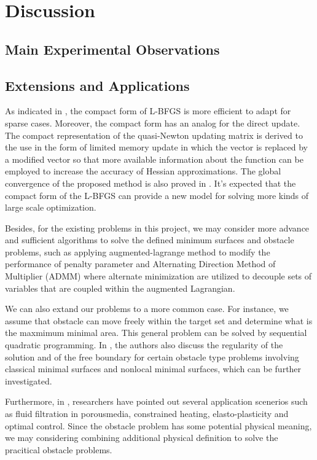 \section{Discussion}
\subsection{Main Experimental Observations}
\subsection{Extensions and Applications}
As indicated in \cite{yueting2007compact}, the compact form of L-BFGS is more efficient to adapt for sparse cases. Moreover, the compact form has an analog for the direct update. The compact representation of the quasi-Newton updating matrix is derived to the use in the form of limited memory update in which the vector is replaced by a modified vector so that more available information about the function can be employed to increase the accuracy of Hessian approximations. The global convergence of the proposed method is also proved in \cite{yueting2007compact}. It’s expected that the compact form of the L-BFGS can provide a new model for solving more kinds of large scale optimization. 

Besides, for the existing problems in this project, we may consider more advance and sufficient algorithms to solve the defined minimum surfaces and obstacle problems, such as applying augmented-lagrange method to modify the performance of penalty parameter and Alternating Direction Method of Multiplier (ADMM) where alternate minimization are utilized to decouple sets of variables that are coupled within the augmented Lagrangian.

We can also extand our problems to a more common case. For instance, we assume that obstacle can move freely within the target set and determine what is the maxmimum minimal area. This general problem can be solved by 
sequential quadratic programming. In \cite{caffarelli2016obstacle}, the authors also discuss the regularity of the solution and of the free boundary for certain obstacle type problems involving classical minimal surfaces and nonlocal minimal surfaces, which can be further investigated.

Furthermore, in \cite{attouch2014variational}, researchers have pointed out several application scenerios such as fluid filtration in porousmedia, constrained heating, elasto-plasticity and optimal control. Since the obstacle problem has some potential physical meaning, we may considering combining additional physical definition to solve the pracitical obstacle problems.